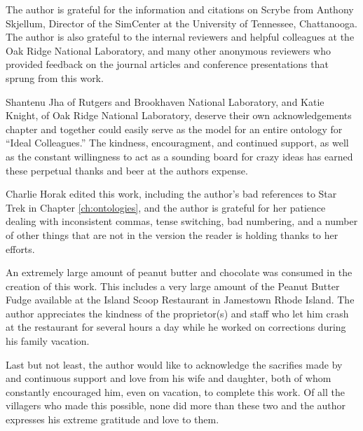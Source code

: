 The author is grateful for the information and citations on Scrybe from Anthony
Skjellum, Director of the SimCenter at the University of Tennessee,
Chattanooga. The author is also grateful to the internal reviewers and helpful
colleagues at the Oak Ridge National Laboratory, and many other anonymous
reviewers who provided feedback on the journal articles and conference
presentations that sprung from this work.

Shantenu Jha of Rutgers and Brookhaven National Laboratory, and Katie Knight, of
Oak Ridge National Laboratory, deserve their own acknowledgements chapter and
together could easily serve as the model for an entire ontology for ``Ideal
Colleagues.'' The kindness, encouragment, and continued support, as well as the
constant willingness to act as a sounding board for crazy ideas has earned these
perpetual thanks and beer at the authors expense.

Charlie Horak edited this work, including the author's bad references to Star
Trek in Chapter \ref{ch:ontologies}, and the author is grateful for her patience
dealing with inconsistent commas, tense switching, bad numbering, and a number
of other things that are not in the version the reader is holding thanks to her
efforts.

An extremely large amount of peanut butter and chocolate was consumed in the
creation of this work. This includes a very large amount of the Peanut Butter
Fudge available at the Island Scoop Restaurant in Jamestown Rhode Island. The
author appreciates the kindness of the proprietor(s) and staff who let him crash
at the restaurant for several hours a day while he worked on corrections during
his family vacation.

Last but not least, the author would like to acknowledge the sacrifies made by
and continuous support and love from his wife and daughter, both of whom
constantly encouraged him, even on vacation, to complete this work. Of all the
villagers who made this possible, none did more than these two and the author
expresses his extreme gratitude and love to them.
